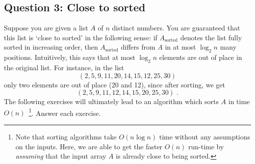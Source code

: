 \subsection*{Question 3: Close to sorted}
Suppose you are given a list $A$ of $n$ distinct numbers. You are guaranteed that this list is `close to sorted' in the following sense: if $A_{\text{sorted}}$ denotes the list fully sorted in increasing order, then $A_{\text{sorted}}$ differs from $A$ in at most $\log_2 n$ many positions. Intuitively, this says that at most $\log_2 n$ elements are out of place in the original list. For instance, in the list 
\[
(2,5,9,11,20,14,15,12,25,30)
\]
only two elements are out of place (20 and 12), since after sorting, we get 
\[
(2,5,9,11,12,14,15,20,25,30) \;.
\]
The following exercises will ultimately lead to an algorithm which sorts $A$ in time $O(n)$~\footnote{Note that sorting algorithms take $O(n\log n)$ time without any assumptions on the inputs. Here, we are able to get the faster $O(n)$ run-time by \emph{assuming} that the input array $A$ is already close to being sorted.}. Answer each exercise.

